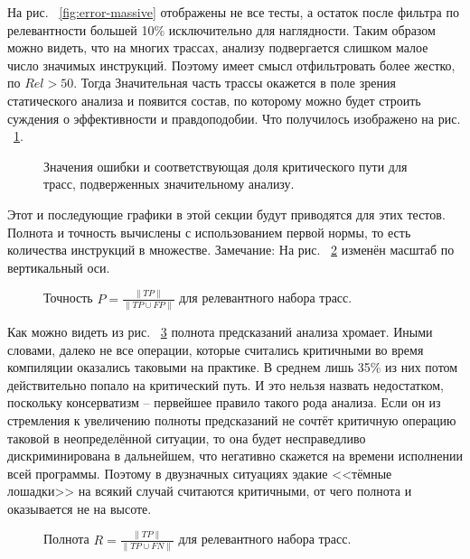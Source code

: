 \documentclass[a4paper,12pt,titlepage]{article}
\newcommand*{\fig}[1]{рис. ~{\ref{fig:#1}}}
\begin{document}
На \fig{error-massive} отображены не все тесты, а остаток после фильтра по релевантности большей 10\% исключительно для наглядности. Таким образом можно видеть, что на многих трассах, анализу подвергается слишком малое число значимых инструкций. Поэтому имеет смысл отфильтровать более жестко, по $Rel > 50$. Тогда Значительная часть трассы окажется в поле зрения статического анализа и появится состав, по которому можно будет строить суждения о эффективности и правдоподобии. Что получилось изображено на \fig{error-50}.
\begin{figure}[!hb]

\vspace{-1cm}
\caption{Значения ошибки и соответствующая доля критического пути для трасс, подверженных значительному анализу.}
\label{fig:error-50}
\end{figure}

\pagebreak
Этот и последующие графики в этой секции будут приводятся для этих тестов. Полнота и точность вычислены с использованием первой нормы, то есть количества инструкций в множестве. Замечание: На \fig{precision} изменён масштаб по вертикальный оси.

\begin{figure}[!hb]

\caption{Точность $P=\frac{\parallel TP \parallel}{\parallel TP \cup FP \parallel}$ для релевантного набора трасс.}
\label{fig:precision}
\end{figure}
Как можно видеть из \fig{recall} полнота предсказаний анализа хромает. Иными словами, далеко не все операции, которые считались критичными во время компиляции оказались таковыми на практике. В среднем лишь 35\% из них потом действительно попало на критический путь. И это нельзя назвать недостатком, поскольку консерватизм -- первейшее правило такого рода анализа. Если он из стремления к увеличению полноты предсказаний не сочтёт критичную операцию таковой в неопределённой ситуации, то она будет несправедливо дискриминирована в дальнейшем, что негативно скажется на времени исполнении всей программы. Поэтому в двузначных ситуациях эдакие <<тёмные лошадки>> на всякий случай считаются критичными, от чего полнота и оказывается не на высоте.
\begin{figure}[!h]

\caption{Полнота $R=\frac{\parallel TP \parallel}{\parallel TP \cup FN \parallel}$ для релевантного набора трасс.}
\label{fig:recall}
\end{figure}

\newpage
\end{document}
